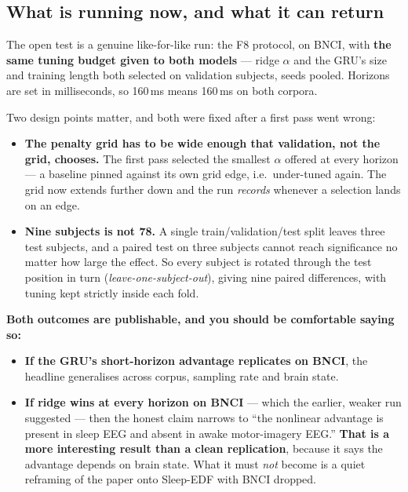 \documentclass[11pt]{article}
\begin{document}
\subsection{What is running now, and what it can return}

The open test is a genuine like-for-like run: the F8 protocol, on BNCI, with
\textbf{the same tuning budget given to both models} --- ridge $\alpha$ and the
GRU's size and training length both selected on validation subjects, seeds
pooled. Horizons are set in milliseconds, so 160\,ms means 160\,ms on both
corpora.

Two design points matter, and both were fixed after a first pass went wrong:

\begin{itemize}
\item \textbf{The penalty grid has to be wide enough that validation, not the
grid, chooses.} The first pass selected the smallest $\alpha$ offered at every
horizon --- a baseline pinned against its own grid edge, i.e.\ under-tuned again.
The grid now extends further down and the run \emph{records} whenever a selection
lands on an edge.
\item \textbf{Nine subjects is not 78.} A single train/validation/test split
leaves three test subjects, and a paired test on three subjects cannot reach
significance no matter how large the effect. So every subject is rotated through
the test position in turn (\emph{leave-one-subject-out}), giving nine paired
differences, with tuning kept strictly inside each fold.
\end{itemize}

\textbf{Both outcomes are publishable, and you should be comfortable saying so:}

\begin{itemize}
\item \textbf{If the GRU's short-horizon advantage replicates on BNCI}, the
headline generalises across corpus, sampling rate and brain state.
\item \textbf{If ridge wins at every horizon on BNCI} --- which the earlier,
weaker run suggested --- then the honest claim narrows to ``the nonlinear
advantage is present in sleep EEG and absent in awake motor-imagery EEG.''
\textbf{That is a more interesting result than a clean replication}, because it
says the advantage depends on brain state. What it must \emph{not} become is a
quiet reframing of the paper onto Sleep-EDF with BNCI dropped.
\end{itemize}
\end{document}
